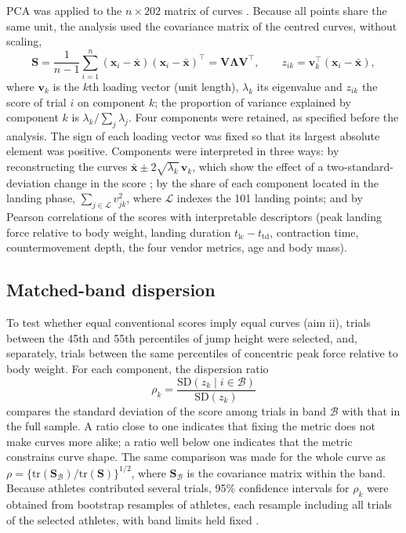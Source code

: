 PCA was applied to the $n \times 202$ matrix of curves \citep{jolliffe2002,jolliffe2016}. Because all points share the same unit, the analysis used the covariance matrix of the centred curves, without scaling,
\begin{equation}
\mathbf{S} = \frac{1}{n-1}\sum_{i=1}^{n}(\mathbf{x}_i - \bar{\mathbf{x}})(\mathbf{x}_i - \bar{\mathbf{x}})^{\top} = \mathbf{V}\boldsymbol{\Lambda}\mathbf{V}^{\top},
\qquad
z_{ik} = \mathbf{v}_k^{\top}(\mathbf{x}_i - \bar{\mathbf{x}}),
\end{equation}
where $\mathbf{v}_k$ is the $k$th loading vector (unit length), $\lambda_k$ its eigenvalue and $z_{ik}$ the score of trial $i$ on component $k$; the proportion of variance explained by component $k$ is $\lambda_k / \sum_j \lambda_j$. Four components were retained, as specified before the analysis. The sign of each loading vector was fixed so that its largest absolute element was positive. Components were interpreted in three ways: by reconstructing the curves $\bar{\mathbf{x}} \pm 2\sqrt{\lambda_k}\,\mathbf{v}_k$, which show the effect of a two-standard-deviation change in the score \citep{brandon2013,warmenhoven2019}; by the share of each component located in the landing phase, $\sum_{j \in \mathcal{L}} v_{jk}^2$, where $\mathcal{L}$ indexes the 101 landing points; and by Pearson correlations of the scores with interpretable descriptors (peak landing force relative to body weight, landing duration $t_{\mathrm{lc}} - t_{\mathrm{td}}$, contraction time, countermovement depth, the four vendor metrics, age and body mass).

\subsection{Matched-band dispersion}

To test whether equal conventional scores imply equal curves (aim ii), trials between the 45th and 55th percentiles of jump height were selected, and, separately, trials between the same percentiles of concentric peak force relative to body weight. For each component, the dispersion ratio
\begin{equation}
\rho_k = \frac{\mathrm{SD}(z_{k} \mid i \in \mathcal{B})}{\mathrm{SD}(z_{k})}
\end{equation}
compares the standard deviation of the score among trials in band $\mathcal{B}$ with that in the full sample. A ratio close to one indicates that fixing the metric does not make curves more alike; a ratio well below one indicates that the metric constrains curve shape. The same comparison was made for the whole curve as $\rho = \{\mathrm{tr}(\mathbf{S}_{\mathcal{B}})/\mathrm{tr}(\mathbf{S})\}^{1/2}$, where $\mathbf{S}_{\mathcal{B}}$ is the covariance matrix within the band. Because athletes contributed several trials, 95\% confidence intervals for $\rho_k$ were obtained from \nBoot{} bootstrap resamples of athletes, each resample including all trials of the selected athletes, with band limits held fixed \citep{efron1993}.

